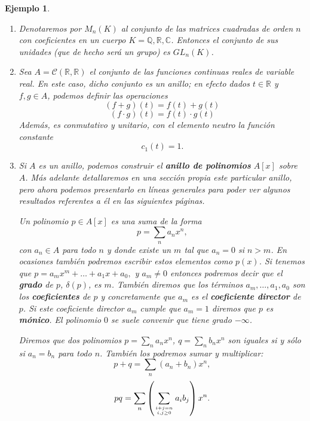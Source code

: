 \documentclass[12pt]{article}
\newtheorem{example}{Ejemplo}[theorem]
\begin{document}
\begin{example}
\begin{enumerate}
En resumen, $a \in \mathcal{U}(M_{2})$ si y sólo si $det(a) \in \mathcal{U}(A)$. Por ejemplo, si $A = \mathbb{Z}$, los enteros, $a$ será unidad si y sólo si $det(a) = \pm 1$. Pero si $A = \mathbb{Q}$ (ó cualquier cuerpo), $a$ será unidad si y sólo si $det(a) \neq 0$, ya que en un cuerpo todos los elementos a excepción del $0$ son unidades.

De todo esto podemos decir que el \textbf{determinante} nos puede caracterizar las unidades y nos permite, como ya sabemos del álgebra lineal, el cálculo de inversos. Si lo vemos como un homomorfismo de grupos, es fácil demostrar que, dados $a,b \in M_{2}$ $$det(ab) = det(a)det(b).$$ Finalmente apuntar que todo lo visto en este ejemplo es aplicable para matrices de un orden $n \geq 2$ cualquiera.
\item Denotaremos por $M_n(K)$ al conjunto de las matrices cuadradas de orden $n$ con coeficientes en un cuerpo $K = \mathbb{Q}, \mathbb{R}, \mathbb{C}$. Entonces el conjunto de sus unidades (que de hecho será un grupo) es $GL_n(K)$.  
\item Sea $A = \mathcal{C}(\mathbb{R}, \mathbb{R})$ el conjunto de las funciones continuas reales de variable real. En este caso, dicho conjunto es un anillo; en efecto dados $t \in \mathbb{R}$ y $f,g \in A$, podemos definir las operaciones $$(f+g)(t) = f(t) + g(t)$$ $$(f \cdot g)(t) = f(t) \cdot g(t)$$
Además, es conmutativo y unitario, con el elemento neutro la función constante $$c_{1}(t) = 1.$$
\item Si $A$ es un anillo, podemos construir el \textbf{anillo de polinomios} $A[x]$ sobre $A$. Más adelante detallaremos en una sección propia este particular anillo, pero ahora podemos presentarlo en líneas generales para poder ver algunos resultados referentes a él en las siguientes páginas. 

Un polinomio $p \in A[x]$ es una suma de la forma $$p = \sum_n a_nx^n,$$ con $a_n \in A$ para todo $n$ y donde existe un $m$ tal que $a_n=0$ si $n>m$. En ocasiones también podremos escribir estos elementos como $p(x)$. Si tenemos que $p=a_mx^m+\ldots+a_1x+a_0,$ y $a_m\neq 0$ entonces podremos decir que el \textbf{grado} de $p$, $\delta(p)$, es $m$. También diremos que los términos $a_m,\ldots, a_1, a_0$ son los \textbf{coeficientes} de $p$ y concretamente que $a_m$ es el \textbf{coeficiente director} de $p$. Si este coeficiente director $a_m$ cumple que $a_m =1$ diremos que $p$ es \textbf{mónico}. El polinomio $0$ se suele convenir que tiene grado $-\infty$.

Diremos que dos polinomios $p = \sum_n a_nx^n$, $q = \sum	_n b_nx^n$ son iguales si y sólo si $a_n = b_n$ para todo $n$. También los podremos sumar y multiplicar: $$p+q= \sum_n(a_n+b_n)x^n,$$ $$pq = \sum_n\left(\sum_{i+j=n \atop i,j\geq 0} a_ib_j \right) x^n.$$
\end{enumerate}
\end{example}
\end{document}
